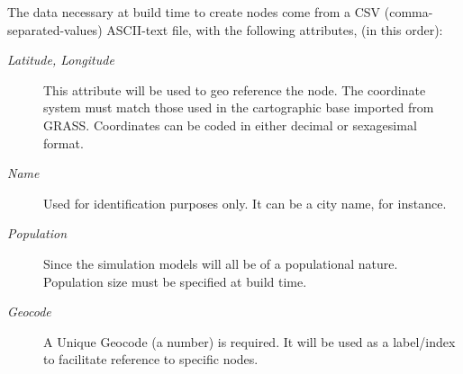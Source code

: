 \documentclass[a4paper,10pt,english]{sphinxmanual}
\begin{document}
The data necessary at build time to create nodes come from a CSV (comma-separated-values) ASCII-text file, with the following attributes, (in this order):
\begin{description}
\item[{\emph{Latitude, Longitude}}] \leavevmode
This attribute will be used to geo reference the  node. The coordinate system must match those used in the cartographic base imported from GRASS. Coordinates can be coded in either decimal or sexagesimal format.

\item[{\emph{Name}}] \leavevmode
Used for identification purposes only. It can be a city name, for instance.

\item[{\emph{Population}}] \leavevmode
Since the simulation models will all be of a populational nature. Population size must be specified at build time.

\item[{\emph{Geocode}}] \leavevmode
A Unique Geocode (a number) is required. It will be used as a label/index to facilitate  reference to specific nodes.

\end{description}

\end{document}
